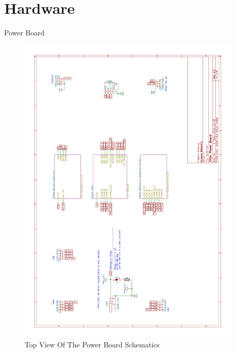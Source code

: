 \documentclass[apectratio=169]{beamer}
\begin{document}
  \section{Hardware}
  	\begin{frame}{Power Board}
		\begin{figure}
			\centering
			\includegraphics[width=0.95\textwidth]{./fig/power}
			\caption{Top View Of The Power Board Schematics}
		\end{figure}	
  	\end{frame}
\end{document}
